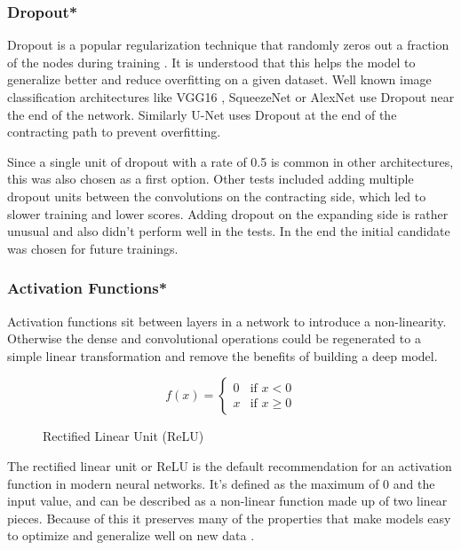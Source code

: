 \subsubsection{Dropout*}

Dropout is a popular regularization technique that randomly zeros out a fraction of the nodes during training \cite{Srivastava2014}. It is understood that this helps the model to generalize better and reduce overfitting on a given dataset. Well known image classification architectures like VGG16 \cite{Simonyan2014a}, SqueezeNet \cite{Iandola2016a} or AlexNet \cite{Krizhevsky} use Dropout near the end of the network. Similarly U-Net uses Dropout at the end of the contracting path to prevent overfitting.

Since a single unit of dropout with a rate of 0.5 is common in other architectures, this was also chosen as a first option. Other tests included adding multiple dropout units between the convolutions on the contracting side, which led to slower training and lower scores. Adding dropout on the expanding side is rather unusual and also didn't perform well in the tests. In the end the initial candidate was chosen for future trainings.

\subsubsection{Activation Functions*}

Activation functions sit between layers in a network to introduce a non-linearity. Otherwise the dense and convolutional operations could be regenerated to a simple linear transformation and remove the benefits of building a deep model.

\begin{figure}[H]
\[
f(x) =
\begin{cases} 
0 & \text{if } x < 0  \\
x & \text{if } x \geq 0
\end{cases}
\]
\caption{Rectified Linear Unit (ReLU)}
\end{figure}

The rectified linear unit or ReLU \cite{Nair} is the default recommendation for an activation function in modern neural networks. It's defined as the maximum of 0 and the input value, and can be described as a non-linear function made up of two linear pieces. Because of this it preserves many of the properties that make models easy to optimize and generalize well on new data \cite{Goodfellow2016}.

